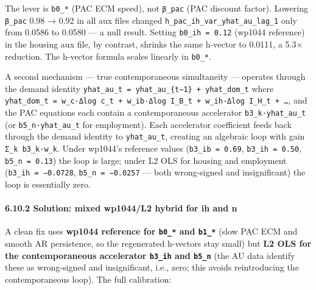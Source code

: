 \documentclass[
]{article}
\begin{document}
The lever is \texttt{b0\_*} (PAC ECM speed), not \texttt{β\_pac} (PAC
discount factor). Lowering \texttt{β\_pac} 0.98 → 0.92 in all aux files
changed \texttt{h\_pac\_ih\_var\_yhat\_au\_lag\_1} only from 0.0586 to
0.0580 --- a null result. Setting \texttt{b0\_ih\ =\ 0.12} (wp1044
reference) in the housing aux file, by contrast, shrinks the same
h-vector to 0.0111, a 5.3× reduction. The h-vector formula scales
linearly in \texttt{b0\_*}.

A second mechanism --- true contemporaneous simultaneity --- operates
through the demand identity
\texttt{yhat\_au\_t\ =\ yhat\_au\_\{t−1\}\ +\ yhat\_dom\_t} where
\texttt{yhat\_dom\_t\ =\ w\_c·Δlog\ c\_t\ +\ w\_ib·Δlog\ I\_B\_t\ +\ w\_ih·Δlog\ I\_H\_t\ +\ …},
and the PAC equations each contain a contemporaneous accelerator
\texttt{b3\_k·yhat\_au\_t} (or \texttt{b5\_n·yhat\_au\_t} for
employment). Each accelerator coefficient feeds back through the demand
identity to \texttt{yhat\_au\_t}, creating an algebraic loop with gain
\texttt{Σ\_k\ b3\_k·w\_k}. Under wp1044's reference values
(\texttt{b3\_ib\ =\ 0.69}, \texttt{b3\_ih\ =\ 0.50},
\texttt{b5\_n\ =\ 0.13}) the loop is large; under L2 OLS for housing and
employment (\texttt{b3\_ih\ =\ −0.0728}, \texttt{b5\_n\ =\ −0.0257} ---
both wrong-signed and insignificant) the loop is essentially zero.

\paragraph{6.10.2 Solution: mixed wp1044/L2 hybrid for ih and
n}\label{solution-mixed-wp1044l2-hybrid-for-ih-and-n}

A clean fix uses \textbf{wp1044 reference for \texttt{b0\_*} and
\texttt{b1\_*}} (slow PAC ECM and smooth AR persistence, so the
regenerated h-vectors stay small) but \textbf{L2 OLS for the
contemporaneous accelerator \texttt{b3\_ih} and \texttt{b5\_n}} (the AU
data identify these as wrong-signed and insignificant, i.e., zero; this
avoids reintroducing the contemporaneous loop). The full calibration:
\end{document}
